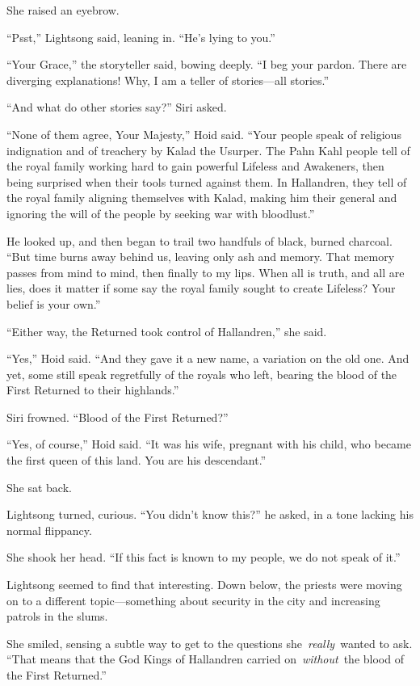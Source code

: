She raised an eyebrow.

“Psst,” Lightsong said, leaning in. “He’s lying to you.”

“Your Grace,” the storyteller said, bowing deeply. “I beg your pardon. There are diverging explanations! Why, I am a teller of stories—all stories.”

“And what do other stories say?” Siri asked.

“None of them agree, Your Majesty,” Hoid said. “Your people speak of religious indignation and of treachery by Kalad the Usurper. The Pahn Kahl people tell of the royal family working hard to gain powerful Lifeless and Awakeners, then being surprised when their tools turned against them. In Hallandren, they tell of the royal family aligning themselves with Kalad, making him their general and ignoring the will of the people by seeking war with bloodlust.”

He looked up, and then began to trail two handfuls of black, burned charcoal. “But time burns away behind us, leaving only ash and memory. That memory passes from mind to mind, then finally to my lips. When all is truth, and all are lies, does it matter if some say the royal family sought to create Lifeless? Your belief is your own.”

“Either way, the Returned took control of Hallandren,” she said.

“Yes,” Hoid said. “And they gave it a new name, a variation on the old one. And yet, some still speak regretfully of the royals who left, bearing the blood of the First Returned to their highlands.”

Siri frowned. “Blood of the First Returned?”

“Yes, of course,” Hoid said. “It was his wife, pregnant with his child, who became the first queen of this land. You are his descendant.”

She sat back.

Lightsong turned, curious. “You didn’t know this?” he asked, in a tone lacking his normal flippancy.

She shook her head. “If this fact is known to my people, we do not speak of it.”

Lightsong seemed to find that interesting. Down below, the priests were moving on to a different topic—something about security in the city and increasing patrols in the slums.

She smiled, sensing a subtle way to get to the questions she~\textit{really}~wanted to ask. “That means that the God Kings of Hallandren carried on~\textit{without}~the blood of the First Returned.”


